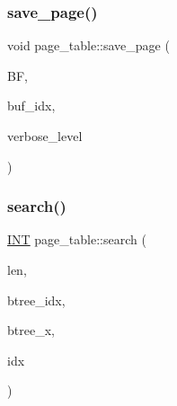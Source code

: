 \mbox{\label{classpage__table_a9cfaa5c50aab8724164a3fa28055fc26}} 
\subsubsection{\texorpdfstring{save\+\_\+page()}{save\_page()}}
{\footnotesize\ttfamily void page\+\_\+table\+::save\+\_\+page (\begin{DoxyParamCaption}\item[{\mbox{\hyperlink{discreta_8h_a4966414b761cd8d10ba385fe5e7c07fc}{Buffer}} $\ast$}]{BF,  }\item[{\mbox{\hyperlink{galois_8h_a09fddde158a3a20bd2dcadb609de11dc}{I\+NT}}}]{buf\+\_\+idx,  }\item[{\mbox{\hyperlink{galois_8h_a09fddde158a3a20bd2dcadb609de11dc}{I\+NT}}}]{verbose\+\_\+level }\end{DoxyParamCaption})}

\mbox{\label{classpage__table_a6a785ea8bdc6d346f1fce0181f76969c}} 
\subsubsection{\texorpdfstring{search()}{search()}}
{\footnotesize\ttfamily \mbox{\hyperlink{galois_8h_a09fddde158a3a20bd2dcadb609de11dc}{I\+NT}} page\+\_\+table\+::search (\begin{DoxyParamCaption}\item[{\mbox{\hyperlink{galois_8h_a09fddde158a3a20bd2dcadb609de11dc}{I\+NT}}}]{len,  }\item[{\mbox{\hyperlink{galois_8h_a09fddde158a3a20bd2dcadb609de11dc}{I\+NT}}}]{btree\+\_\+idx,  }\item[{\mbox{\hyperlink{galois_8h_a09fddde158a3a20bd2dcadb609de11dc}{I\+NT}}}]{btree\+\_\+x,  }\item[{\mbox{\hyperlink{galois_8h_a09fddde158a3a20bd2dcadb609de11dc}{I\+NT}} \&}]{idx }\end{DoxyParamCaption})}

\mbox{\label{classpage__table_ad382cc58d94dfe8edb98d11748c800b8}} 
